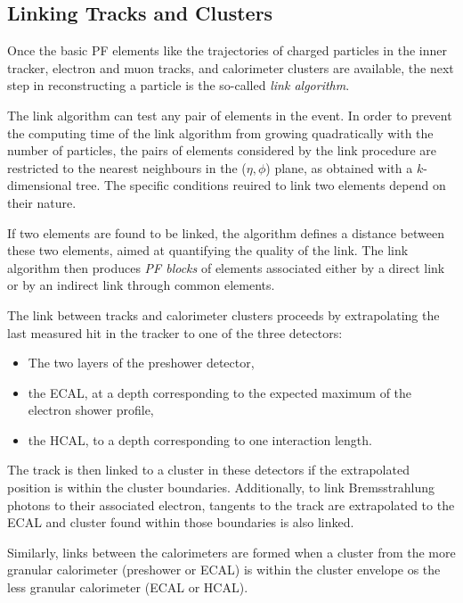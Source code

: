 \subsection{Linking Tracks and Clusters}
Once the basic PF elements like the trajectories of charged particles in the inner tracker, electron and muon tracks, and calorimeter clusters are available, the next step in reconstructing a particle is the so-called \textit{link algorithm}.

 The link algorithm can test any pair of elements in the event. In order to prevent the computing time of the link algorithm from growing quadratically with the number of particles, the pairs of elements considered by the link procedure are restricted to the nearest neighbours in the ($\eta,\phi$) plane, as obtained with a $k$-dimensional tree\cite{Bentley1975MultidimensionalBS}. The specific conditions reuired to link two elements depend on their nature.

 If two elements are found to be linked, the algorithm defines a distance between these two elements, aimed at quantifying the quality of the link. The link algorithm then produces \textit{PF blocks} of elements associated either by a direct link or by an indirect link through common elements.

 The link between tracks and calorimeter clusters proceeds by extrapolating the last measured hit in the tracker to one of the three detectors\cite{CMS:2009nxa}:

 \begin{itemize}
 	\item The two layers of the preshower detector,
 	\item the ECAL, at a depth corresponding to the expected maximum of the electron shower profile,
 	\item the HCAL, to a depth corresponding to one interaction length.
 \end{itemize}

 The track is then linked to a cluster in these detectors if the extrapolated position is within the cluster boundaries. Additionally, to link Bremsstrahlung photons to their associated electron, tangents to the track are extrapolated to the ECAL and cluster found within those boundaries is also linked.

 Similarly, links between the calorimeters are formed when a cluster from the more granular calorimeter (preshower or ECAL) is within the cluster envelope os the less granular calorimeter (ECAL or HCAL).

